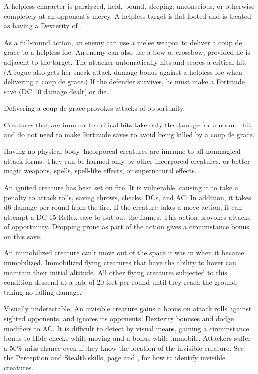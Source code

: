  A helpless character is paralyzed, held, bound, sleeping, unconscious, or otherwise completely at an opponent's mercy. A helpless target is flat-footed and is treated as having a Dexterity of .

As a full-round action, an enemy can use a melee weapon to deliver a coup de grace to a helpless foe. An enemy can also use a bow or crossbow, provided he is adjacent to the target. The attacker automatically hits and scores a critical hit. (A rogue also gets her sneak attack damage bonus against a helpless foe when delivering a coup de grace.) If the defender survives, he must make a Fortitude save (DC 10 \add damage dealt) or die.

Delivering a coup de grace provokes attacks of opportunity.

Creatures that are immune to critical hits take only the damage for a normal hit, and do not need to make Fortitude saves to avoid being killed by a coup de grace.

 Having no physical body. Incorporeal creatures are immune to all nonmagical attack forms. They can be harmed only by other incorporeal creatures,  or better magic weapons, spells, spell-like effects, or supernatural effects.

 An ignited creature has been set on fire. It is vulnerable, causing it to take a  penalty to attack rolls, saving throws, checks, DCs, and AC. In addition, it takes d6 damage per round from the fire. If the creature takes a move action, it can attempt a DC 15 Reflex save to put out the flames. This action provokes attacks of opportunity. Dropping prone as part of the action gives a  circumstance bonus on this save.

 An immobilized creature can't move out of the space it was in when it became immobilized. Immobilized flying creatures that have the ability to hover can maintain their initial altitude. All other flying creatures subjected to this condition descend at a rate of 20 feet per round until they reach the ground, taking no falling damage.

 Visually undetectable. An invisible creature gains a  bonus on attack rolls against sighted opponents, and ignores its opponents' Dexterity bonuses and dodge modifiers to AC. It is difficult to detect by visual means, gaining a  circumstance bonus to Hide checks while moving and a  bonus while immobile. Attackers suffer a 50\% miss chance even if they know the location of the invisible creature. See the Perception and Stealth skills, page  and , for how to identify invisible creatures.

